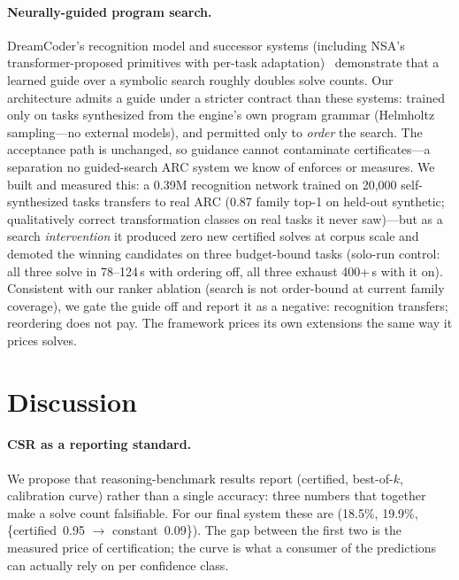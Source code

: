 \documentclass[11pt]{article}
\begin{document}
\paragraph{Neurally-guided program search.}
DreamCoder's recognition model and successor systems (including NSA's
transformer-proposed primitives with per-task
adaptation)~\citep{ellis2021dreamcoder} demonstrate that a learned guide
over a symbolic search roughly doubles solve counts.  Our architecture
admits a guide under a stricter contract than these systems: trained only on
tasks synthesized from the engine's own program grammar (Helmholtz
sampling---no external models), and permitted only to \emph{order} the
search.  The acceptance path is unchanged, so guidance cannot contaminate
certificates---a separation no guided-search ARC system we know of
enforces or measures.  We built and measured this: a 0.39M recognition
network trained on 20{,}000 self-synthesized tasks transfers to real ARC
(0.87 family top-1 on held-out synthetic; qualitatively correct
transformation classes on real tasks it never saw)---but as a search
\emph{intervention} it produced zero new certified solves at corpus scale
and demoted the winning candidates on three budget-bound tasks (solo-run
control: all three solve in 78--124\,s with ordering off, all three exhaust
400+\,s with it on).  Consistent with our ranker ablation (search is not
order-bound at current family coverage), we gate the guide off and report
it as a negative: recognition transfers; reordering does not pay.  The
framework prices its own extensions the same way it prices solves.

\section{Discussion}

\paragraph{CSR as a reporting standard.}
We propose that reasoning-benchmark results report (certified, best-of-$k$,
calibration curve) rather than a single accuracy: three numbers that
together make a solve count falsifiable.  For our final system these are
(18.5\%, 19.9\%, \{certified~0.95 $\to$ constant~0.09\}).  The gap between
the first two is the measured price of certification; the curve is what a
consumer of the predictions can actually rely on per confidence class.
\end{document}
